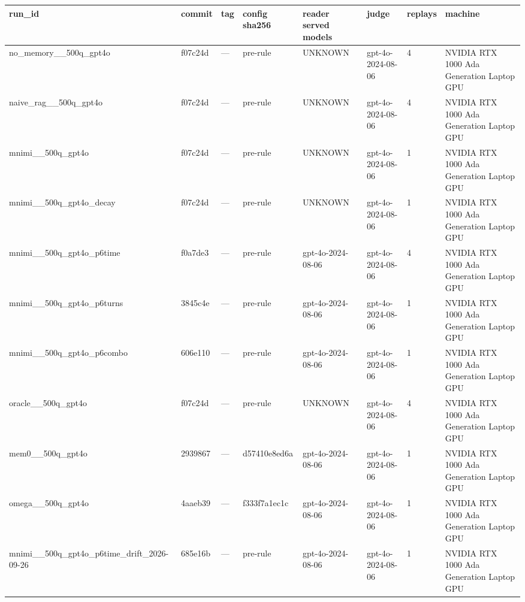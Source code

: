 \begin{tabular}{llllllll}
\toprule
run\_id & commit & tag & config sha256 & reader served models & judge & replays & machine \\
\midrule
no\_memory\_\_500q\_gpt4o & f07c24d & --- & pre-rule & UNKNOWN & gpt-4o-2024-08-06 & 4 & NVIDIA RTX 1000 Ada Generation Laptop GPU \\
naive\_rag\_\_500q\_gpt4o & f07c24d & --- & pre-rule & UNKNOWN & gpt-4o-2024-08-06 & 4 & NVIDIA RTX 1000 Ada Generation Laptop GPU \\
mnimi\_\_500q\_gpt4o & f07c24d & --- & pre-rule & UNKNOWN & gpt-4o-2024-08-06 & 1 & NVIDIA RTX 1000 Ada Generation Laptop GPU \\
mnimi\_\_500q\_gpt4o\_decay & f07c24d & --- & pre-rule & UNKNOWN & gpt-4o-2024-08-06 & 1 & NVIDIA RTX 1000 Ada Generation Laptop GPU \\
mnimi\_\_500q\_gpt4o\_p6time & f0a7de3 & --- & pre-rule & gpt-4o-2024-08-06 & gpt-4o-2024-08-06 & 4 & NVIDIA RTX 1000 Ada Generation Laptop GPU \\
mnimi\_\_500q\_gpt4o\_p6turns & 3845c4e & --- & pre-rule & gpt-4o-2024-08-06 & gpt-4o-2024-08-06 & 1 & NVIDIA RTX 1000 Ada Generation Laptop GPU \\
mnimi\_\_500q\_gpt4o\_p6combo & 606e110 & --- & pre-rule & gpt-4o-2024-08-06 & gpt-4o-2024-08-06 & 1 & NVIDIA RTX 1000 Ada Generation Laptop GPU \\
oracle\_\_500q\_gpt4o & f07c24d & --- & pre-rule & UNKNOWN & gpt-4o-2024-08-06 & 4 & NVIDIA RTX 1000 Ada Generation Laptop GPU \\
mem0\_\_500q\_gpt4o & 2939867 & --- & d57410e8ed6a & gpt-4o-2024-08-06 & gpt-4o-2024-08-06 & 1 & NVIDIA RTX 1000 Ada Generation Laptop GPU \\
omega\_\_500q\_gpt4o & 4aaeb39 & --- & f333f7a1ec1c & gpt-4o-2024-08-06 & gpt-4o-2024-08-06 & 1 & NVIDIA RTX 1000 Ada Generation Laptop GPU \\
mnimi\_\_500q\_gpt4o\_p6time\_drift\_2026-09-26 & 685e16b & --- & pre-rule & gpt-4o-2024-08-06 & gpt-4o-2024-08-06 & 1 & NVIDIA RTX 1000 Ada Generation Laptop GPU \\
\bottomrule
\end{tabular}
